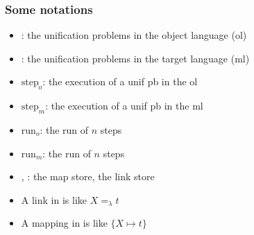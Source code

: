 \documentclass{pres}
\begin{document}
\begin{frame}
  \frametitle{Some notations}

  \begin{itemize}
    \item \foUnifPb: the unification problems in the object language (ol)
    \item \hoUnifPb: the unification problems in the target language (ml)
    \item \ensuremath{{\mathrm{step}}_o}: the execution of a unif pb in the ol
    \item \ensuremath{{\mathrm{step}}_m}: the execution of a unif pb in the ml
    \item \ensuremath{{\mathrm{run}}_o}: the run of $n$ steps
    \item \ensuremath{{\mathrm{run}}_m}: the run of $n$ steps
  \end{itemize}

  \mysep

  \begin{itemize}
    \item \mapStore, \linkStore: the map store, the link store
    \item A link in \linkStore is like $X =_\lambda t$
    \item A mapping in \mapStore is like $\{X \mapsto t\}$ 
  \end{itemize}


\end{frame}
\end{document}
